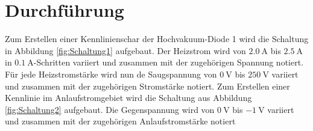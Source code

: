 
\section{Durchführung}
\label{sec:Durchführung}
Zum Erstellen einer Kennlinienschar der Hochvakuum-Diode 1 wird die Schaltung in Abbildung \ref{fig:Schaltung1} aufgebaut. Der Heizstrom wird von $\SI{2.0}{\ampere}$ bis $\SI{2.5}{\ampere}$ in $\SI{0.1}{\ampere}$-Schritten variiert und zusammen mit der zugehörigen Spannung notiert. Für jede Heizstromstärke wird nun de Saugspannung von $\SI{0}{\volt}$ bis $\SI{250}{\volt}$ variiert und zusammen mit der zugehörigen Stromstärke notiert.
Zum Erstellen einer Kennlinie im Anlaufstromgebiet wird die Schaltung aus Abbildung \ref{fig:Schaltung2} aufgebaut. Die Gegenspannung wird von $\SI{0}{\volt}$ bis $\SI{-1}{\volt}$ variiert und zusammen mit der zugehörigen Anlaufstromstärke notiert
